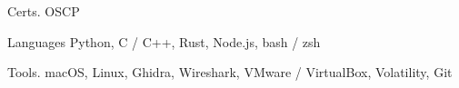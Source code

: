
\begin{cvskills}
	\cvskill
	{Certs\hphantom{25}\color{white}.\hphantom{25}} %
	{OSCP} %

	\cvskill
	{Languages} %
	{Python, C / C++, Rust, Node.js, bash / zsh} %

	\cvskill
	{Tools\hphantom{25}\color{white}.\hphantom{25}} %
	{macOS, Linux, Ghidra, Wireshark, VMware / VirtualBox, Volatility, Git} %

\end{cvskills}
